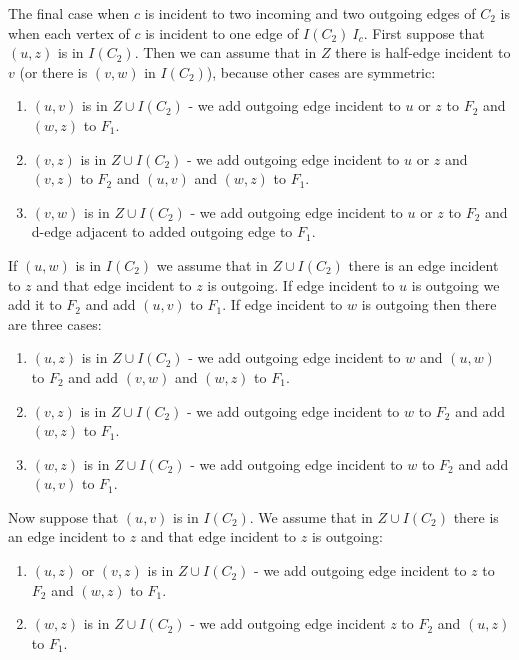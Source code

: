 \documentclass[a4, 11pt]{article}
\newcommand{\<}{\langle}
\renewcommand{\>}{\rangle}
\begin{document}
The final case when $c$ is incident to two incoming and two outgoing edges of $C_2$ is when each vertex of $c$ is incident to one edge of $I(C_2) \ I_c$. First suppose that $(u,z)$ is in $I(C_2)$. Then we can assume that in $Z$ there is half-edge incident to $v$ (or there is $(v,w)$ in $I(C_2)$), because other cases are symmetric:
\begin{enumerate}
	\item $(u,v)$ is in $Z \cup I(C_2)$ - we add outgoing edge incident to $u$ or $z$ to $F_2$ and $(w,z)$ to $F_1$.
	\item $(v,z)$ is in $Z \cup I(C_2)$ - we add outgoing edge incident to $u$ or $z$ and $(v,z)$ to $F_2$ and $(u,v)$ and $(w,z)$ to $F_1$.
	\item $(v,w)$ is in $Z \cup I(C_2)$ - we add outgoing edge incident to $u$ or $z$ to $F_2$ and d-edge adjacent to added outgoing edge to $F_1$.
\end{enumerate}
If $(u,w)$ is in $I(C_2)$ we assume that in $Z \cup I(C_2)$ there is an edge incident to $z$ and that edge incident to $z$ is outgoing. If edge incident to $u$ is outgoing we add it to $F_2$ and add $(u,v)$ to $F_1$. If edge incident to $w$ is outgoing then there are three cases:
\begin{enumerate}
	\item $(u,z)$ is in $Z \cup I(C_2)$ - we add outgoing edge incident to $w$ and $(u,w)$ to $F_2$ and add $(v,w)$ and $(w,z)$ to $F_1$.
	\item $(v,z)$ is in $Z \cup I(C_2)$ - we add outgoing edge incident to $w$ to $F_2$ and add $(w,z)$ to $F_1$.
	\item $(w,z)$ is in $Z \cup I(C_2)$ - we add outgoing edge incident to $w$ to $F_2$ and add $(u,v)$ to $F_1$.
\end{enumerate} 
Now suppose that $(u,v)$ is in $I(C_2)$. We assume that in $Z \cup I(C_2)$ there is an edge incident to $z$ and that edge incident to $z$ is outgoing:
\begin{enumerate}
	\item $(u,z)$ or $(v,z)$ is in $Z \cup I(C_2)$ - we add outgoing edge incident to $z$ to $F_2$ and $(w,z)$ to $F_1$.
	\item $(w,z)$ is in $Z \cup I(C_2)$ - we add outgoing edge incident $z$ to $F_2$ and $(u,z)$ to $F_1$.
\end{enumerate}
\end{document}
